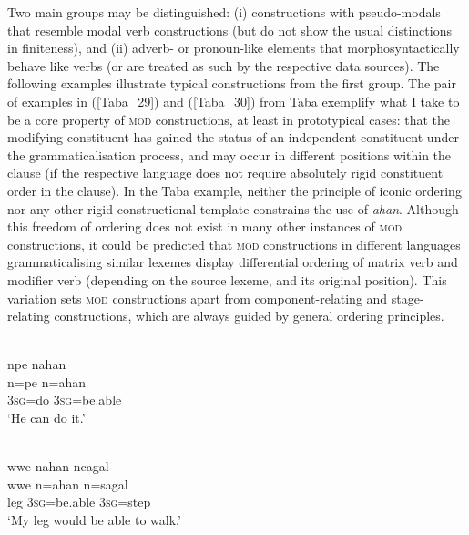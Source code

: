 Two main groups may be distinguished: (i) constructions with pseudo-modals that resemble modal verb constructions (but do not show the usual distinctions in finiteness), and (ii) adverb- or pronoun-like elements that morphosyntactically behave like verbs (or are treated as such by the respective data sources). The following examples illustrate typical constructions from the first group. The pair of examples in (\ref{Taba_29}) and (\ref{Taba_30}) from Taba exemplify what I take to be a core property of \textsc{mod} constructions, at least in prototypical cases: that the modifying constituent has gained the status of an independent constituent under the grammaticalisation process, and may occur in different positions within the clause (if the respective language does not require absolutely rigid constituent order in the clause). In the Taba example, neither the principle of iconic ordering nor any other rigid constructional template constrains the use of \textit{ahan}. Although this freedom of ordering does not exist in many other instances of \textsc{mod} constructions, it could be predicted that \textsc{mod} constructions in different languages grammaticalising similar lexemes display differential ordering of matrix verb and modifier verb (depending on the source lexeme, and its original position). This variation sets \textsc{mod} constructions apart from component-relating and stage-relating constructions, which are always guided by general ordering principles.

\ea \label{Taba_29}
\\
\glll npe nahan \\
n=pe n=ahan \\
3\textsc{sg}=do 3\textsc{sg}=be.able \\
\glft `He can do it.'\\ 
\z

\ea \label{Taba_30}
\\
\glll wwe nahan ncagal \\
wwe n=ahan n=sagal \\
leg 3\textsc{sg}=be.able 3\textsc{sg}=step \\
\glft `My leg would be able to walk.'\\ 
\z

